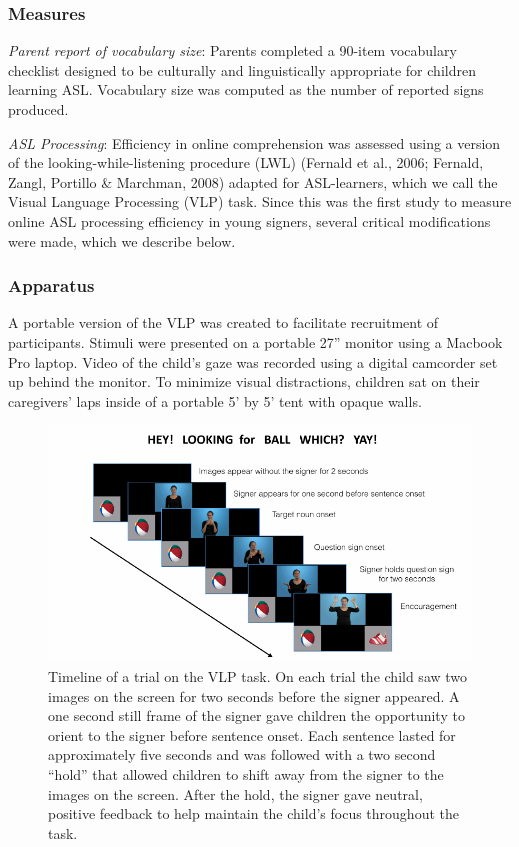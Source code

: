 \documentclass[12pt,]{article}
\begin{document}
\subsubsection{Measures}\label{measures}

\emph{Parent report of vocabulary size}: Parents completed a 90-item
vocabulary checklist designed to be culturally and linguistically
appropriate for children learning ASL. Vocabulary size was computed as
the number of reported signs produced.

\emph{ASL Processing}: Efficiency in online comprehension was assessed
using a version of the looking-while-listening procedure (LWL) (Fernald
et al., 2006; Fernald, Zangl, Portillo \& Marchman, 2008) adapted for
ASL-learners, which we call the Visual Language Processing (VLP) task.
Since this was the first study to measure online ASL processing
efficiency in young signers, several critical modifications were made,
which we describe below.

\subsubsection{Apparatus}\label{apparatus}

A portable version of the VLP was created to facilitate recruitment of
participants. Stimuli were presented on a portable 27'' monitor using a
Macbook Pro laptop. Video of the child's gaze was recorded using a
digital camcorder set up behind the monitor. To minimize visual
distractions, children sat on their caregivers' laps inside of a
portable 5' by 5' tent with opaque walls.

\begin{figure}[htbp]
\centering
\includegraphics{Figs/timeline-1.pdf}
\caption{Timeline of a trial on the VLP task. On each trial the child
saw two images on the screen for two seconds before the signer appeared.
A one second still frame of the signer gave children the opportunity to
orient to the signer before sentence onset. Each sentence lasted for
approximately five seconds and was followed with a two second ``hold''
that allowed children to shift away from the signer to the images on the
screen. After the hold, the signer gave neutral, positive feedback to
help maintain the child's focus throughout the task.}
\end{figure}
\end{document}

